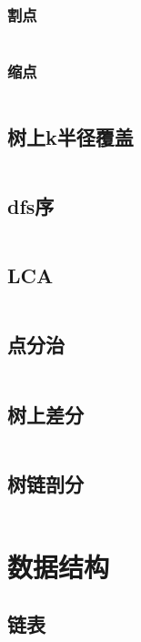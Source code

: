 \documentclass[a4paper,11pt]{article}
\begin{document}
\subsubsection{割点} %
\inputminted[breaklines]{c++}{图论/割点.cpp} %

\subsubsection{缩点} %
\inputminted[breaklines]{c++}{图论/缩点.cpp} %

\subsection{树上k半径覆盖} %
\inputminted[breaklines]{c++}{图论/树上k半径覆盖.cpp} %


\subsection{dfs序} %
\inputminted[breaklines]{c++}{图论/dfs序.cpp} %

\subsection{LCA} %
\inputminted[breaklines]{c++}{图论/LCA.cpp} %

\subsection{点分治} %
\inputminted[breaklines]{c++}{图论/点分治.cpp} %

\subsection{树上差分} %
\inputminted[breaklines]{c++}{图论/树上差分.cpp} %

\subsection{树链剖分} %
\inputminted[breaklines]{c++}{图论/树链剖分.cpp} %

\section{数据结构} %

\subsection{链表} %
\inputminted[breaklines]{c++}{数据结构/链表.cpp} 
\end{document}
